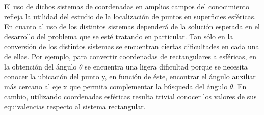 \hspace{4mm} El uso de dichos sistemas de coordenadas en amplios campos del conocimiento refleja la utilidad del estudio de la localización de puntos en superficies esféricas. En cuanto al uso de los distintos sistemas dependerá de la solución esperada en el desarrollo del problema que se esté tratando en particular. Tan sólo en la conversión de los distintos sistemas se encuentran ciertas dificultades en cada una de ellas. Por ejemplo, para convertir coordenadas de rectangulares a esféricas, en la obtención del ángulo ${\theta}$ se encuentra una ligera dificultad porque se necesita conocer la ubicación del punto y, en función de éste, encontrar el ángulo auxiliar más cercano al eje x que permita complementar la búsqueda del ángulo ${\theta}$. En cambio, utilizando coordenadas esféricas resulta trivial conocer los valores de sus equivalencias respecto al sistema rectangular. \cite{ecured}
